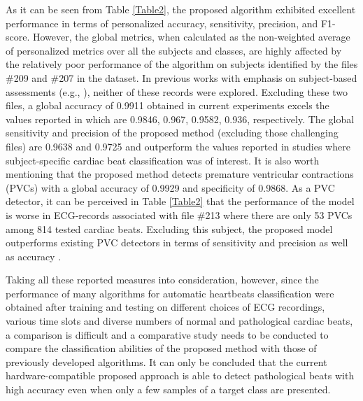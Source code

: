 \documentclass[review]{elsarticle}
\begin{document}
As it can be seen from Table \ref{Table2}, the proposed algorithm exhibited excellent performance in terms of personalized accuracy, sensitivity, precision, and F1-score. However, the global metrics, when calculated as the non-weighted average of personalized metrics over all the subjects and classes, are highly affected by the relatively poor performance of the algorithm on subjects identified by the files \#209 and \#207 in the dataset. In previous works with emphasis on subject-based assessments (e.g., \cite{de2004automatic,engin2004ecg,faezipour2010patient,dutta2010correlation,chen2017heartbeat}), neither of these records were explored. Excluding these two files, a global accuracy of 0.9911 obtained in current experiments excels the values reported in  \cite{chen2017heartbeat,engin2004ecg,dutta2010correlation,de2004automatic} which are 0.9846, 0.967, 0.9582, 0.936, respectively. The global sensitivity and precision of the proposed method (excluding those challenging files) are 0.9638 and 0.9725 and outperform the values reported in studies \cite{de2004automatic,dutta2010correlation,chen2017heartbeat} where subject-specific cardiac beat classification was of interest.
It is also worth mentioning that the proposed method detects premature ventricular contractions (PVCs) with a global accuracy of 0.9929 and specificity of 0.9868. As a PVC detector, it can be perceived in Table \ref{Table2} that the performance of the model is worse in ECG-records associated with file \#213 where there are only 53 PVCs among 814 tested cardiac beats. Excluding this subject, the proposed model outperforms existing PVC detectors in terms of sensitivity and precision as well as accuracy \cite{dutta2010correlation,zhang2014heartbeat, chen2017heartbeat}.

Taking all these reported measures into consideration, however, since the performance of many algorithms for automatic heartbeats classification were obtained after training and testing on different choices of ECG recordings, various time slots and diverse numbers of normal and pathological cardiac beats, a comparison is difficult and a comparative study needs to be conducted to compare the classification abilities of the proposed method with those of previously developed algorithms. It can only be concluded that the current hardware-compatible proposed approach is able to detect pathological beats with high accuracy even when only a few samples of a target class are presented. 
\end{document}
